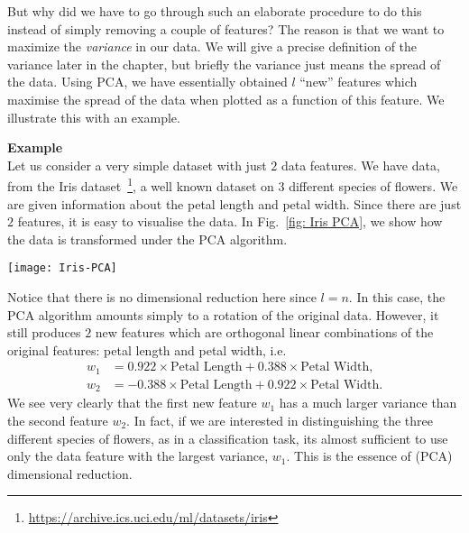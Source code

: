 But why did we have to go through such an elaborate procedure to do this instead of simply removing a couple of features? The reason is that we want to maximize the \textit{variance} in our data. We will give a precise definition of the variance later in the chapter, but briefly the variance just means the spread of the data. Using PCA, we have essentially obtained $l$ ``new'' features which maximise the spread of the data when plotted as a function of this feature. We illustrate this with an example.
\vspace{12pt}

\noindent
\textbf{Example}\vspace{3pt}\\
Let us consider a very simple dataset with just $2$ data features. We have data, from the Iris dataset~\footnote{\href{https://archive.ics.uci.edu/ml/datasets/iris}{https://archive.ics.uci.edu/ml/datasets/iris}}, a well known dataset on 3 different species of flowers. We are given information about the petal length and petal width. Since there are just $2$ features, it is easy to visualise the data. In Fig.~\ref{fig: Iris PCA}, we show how the data is transformed under the PCA algorithm.

\begin{figure*}[t]
  \centering
    \texttt{[image: Iris-PCA]}
    \caption{\textbf{PCA on Iris Dataset.}}
\label{fig: Iris PCA}
\end{figure*}


Notice that there is no dimensional reduction here since $l = n$. In this case, the PCA algorithm amounts simply to a rotation of the original data. However, it still produces $2$ new features which are orthogonal linear combinations of the original features:  petal length and petal width, i.e.
\begin{equation}
    \begin{split}
        w_1 &= 0.922 \times \textrm{Petal Length} + 0.388 \times \textrm{Petal Width}, \\
        w_2 &= -0.388 \times \textrm{Petal Length} + 0.922 \times \textrm{Petal Width}.
    \end{split}
\end{equation}
We see very clearly that the first new feature $w_1$ has a much larger variance than the second feature $w_2$. In fact, if we are interested in distinguishing the three different species of flowers, as in a classification task, its almost sufficient to use only the data feature with the largest variance, $w_1$. This is the essence of (PCA) dimensional reduction.

